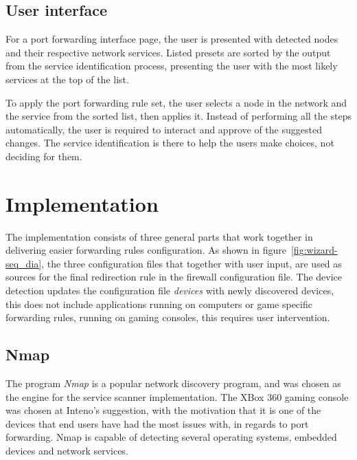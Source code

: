 \documentclass[a4paper,11pt]{kth-bcs}
\begin{document}
   \section{User interface}
For a port forwarding interface page, the user is presented with detected nodes and their respective network services.
Listed presets are sorted by the output from the service identification process, presenting the user with the most likely services at the top of the list.

To apply the port forwarding rule set, the user selects a node in the network and the service from the sorted list, then applies it.
Instead of performing all the steps automatically, the user is required to interact and approve of the suggested changes.
The service identification is there to help the users make choices, not deciding for them.

\chapter{Implementation}
The implementation consists of three general parts that work together in delivering easier forwarding rules configuration.
As shown in figure~\ref{fig:wizard-seq_dia}, the three configuration files that together with user input, are used as sources for the final redirection rule in the firewall configuration file.
The device detection updates the configuration file \emph{devices} with newly discovered devices, this does not include applications running on computers or game specific forwarding rules, running on gaming consoles, this requires user intervention.


\section{Nmap}
The program \emph{Nmap} is a popular network discovery program, and was chosen as the engine for the service scanner implementation.
The XBox 360 gaming console was chosen at Inteno's suggestion, with the motivation that it is one of the devices that end users have had the most issues with, in regards to port forwarding.
Nmap is capable of detecting several operating systems, embedded devices and network services.
\end{document}
